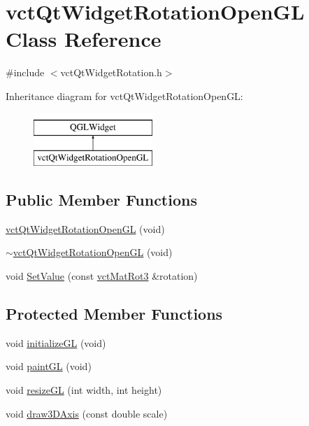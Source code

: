 \hypertarget{classvct_qt_widget_rotation_open_g_l}{}\section{vct\+Qt\+Widget\+Rotation\+Open\+G\+L Class Reference}
\label{classvct_qt_widget_rotation_open_g_l}


{\ttfamily \#include $<$vct\+Qt\+Widget\+Rotation.\+h$>$}

Inheritance diagram for vct\+Qt\+Widget\+Rotation\+Open\+G\+L\+:\begin{figure}[H]
\begin{center}
\leavevmode
\includegraphics[height=2.000000cm]{db/d62/classvct_qt_widget_rotation_open_g_l}
\end{center}
\end{figure}
\subsection*{Public Member Functions}
\begin{DoxyCompactItemize}
\item 
\hyperlink{classvct_qt_widget_rotation_open_g_l_a85770983769f339d9413469cc675459a}{vct\+Qt\+Widget\+Rotation\+Open\+G\+L} (void)
\item 
\hyperlink{classvct_qt_widget_rotation_open_g_l_a8d0b0ed089215ff0a7a151e9c64c22b8}{$\sim$vct\+Qt\+Widget\+Rotation\+Open\+G\+L} (void)
\item 
void \hyperlink{classvct_qt_widget_rotation_open_g_l_a298f09ac2e58f8dbab585ff7043fc39a}{Set\+Value} (const \hyperlink{vct_transformation_types_8h_a30fe23c1d38748a9b8f2fb9bb2471382}{vct\+Mat\+Rot3} \&rotation)
\end{DoxyCompactItemize}
\subsection*{Protected Member Functions}
\begin{DoxyCompactItemize}
\item 
void \hyperlink{classvct_qt_widget_rotation_open_g_l_ae0d4b905ea88519fed5cb4e01a92ff52}{initialize\+G\+L} (void)
\item 
void \hyperlink{classvct_qt_widget_rotation_open_g_l_abd1e68e6770fbbdb57bbe6645b4713da}{paint\+G\+L} (void)
\item 
void \hyperlink{classvct_qt_widget_rotation_open_g_l_a41ac2ac38ff2cc2f789e9681e1327aeb}{resize\+G\+L} (int width, int height)
\item 
void \hyperlink{classvct_qt_widget_rotation_open_g_l_a4bc2dceaacfa29f43cbd134eea70b977}{draw3\+D\+Axis} (const double scale)
\end{DoxyCompactItemize}

